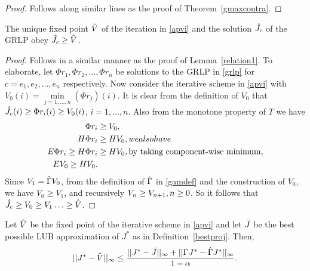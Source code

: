 \begin{proof}
Follows along similar lines as the proof of Theorem~\ref{gmaxcontra}.
\end{proof}
\begin{lemma}\label{relation2}
The unique fixed point $\hat{V}$ of the iteration in \eqref{apvi} and the solution $\hat{J}_c$ of the GRLP obey $\hat{J}_c\geq\hat{V}$.
\end{lemma}
\begin{proof}
Follows in a similar manner as the proof of Lemma~\ref{relation1}. To elaborate, let $\Phi r_1, \Phi r_2,\ldots,\Phi r_n$ be solutions to the GRLP in \eqref{grlp} for $c=e_1, e_2,\ldots,e_n$ respectively. Now consider the iterative scheme in \eqref{apvi} with $V_0(i)=\underset{j=1,\ldots,n}{\min}(\Phi r_j)(i)$. It is clear from the definition of $V_0$ that $\hat{J}_c(i)\geq\Phi r_i(i)\geq V_0(i)$, $i=1,\ldots,n$. Also from the monotone property of $T$ we have 
\begin{align}
\Phi r_i&\geq V_0,\nonumber\\
H\Phi r_i&\geq H V_0,\relax{we also have}\nonumber\\
E\Phi r_i\geq H\Phi r_i&\geq HV_0,\relax{ }\text{by taking component-wise minimum},\nonumber\\
E V_0\geq H V_0.
\end{align}
Since $V_1=\hat{\Gamma} V_0$, from the definition of $\hat{\Gamma}$ in \eqref{gamdef} and the construction of $V_0$, we have $V_0\geq V_1$, and recursively $V_{n}\geq V_{n+1}, \relax{ } n\geq 0$. So it follows that $\hat{J}_c\geq V_0\geq V_1\ldots\geq \hat{V}$.
\end{proof}
\begin{theorem}\label{mt1}
Let $\hat{V}$ be the fixed point of the iterative scheme in \eqref{apvi} and let $\bar{J}$ be the best possible LUB approximation of $J^*$ as in Definition~\ref{bestproj}. Then,
\begin{align}
||J^*-\hat{V}||_\infty\leq \frac{||J^*-\bar{J}||_\infty+||\Gamma J^*-\hat{\Gamma} J^*||_\infty}{1-\alpha}.
\end{align}
\end{theorem}
